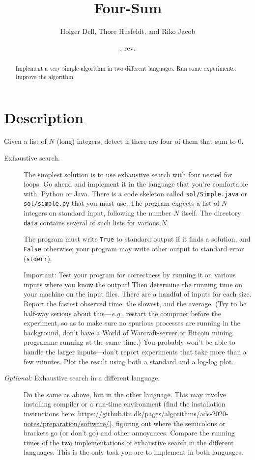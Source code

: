 \documentclass{tufte-handout}
\title{Four-Sum}
\author{Holger Dell, Thore Husfeldt, and Riko Jacob}
\date{\GITAuthorDate, rev. \GITAbrHash}
\begin{document}
\maketitle
\begin{abstract}
  Implement a very simple algorithm in two different languages. Run some experiments.
  Improve the algorithm.
\end{abstract}


 \section{Description}

 Given a list of $N$ (long) integers, detect if there are four of them that sum to $0$.

\begin{description}
  \item[Exhaustive search.]
The simplest solution is to use exhaustive search with four nested for loops.
Go ahead and implement it in the language that you're comfortable with, Python or Java.
There is a code skeleton called \texttt{sol/Simple.java} or \texttt{sol/simple.py} that you must use.
The program expects a list of $N$ integers on standard input, following the number $N$ itself.
The directory \texttt{data} contains several of such lists for various $N$.

The program must write \texttt{True} to standard output if it finds a solution, and \texttt{False} otherwise;
your program may write other output to standard error (\texttt{stderr}).

Important: Test your program for correctness by running it on various inputs where you know the output!
Then determine the running time on your machine on the input files.
There are a handful of inputs for each size.
Report the fastest observed time, the slowest, and the average.
(Try to be half-way serious about this---\emph{e.g.}, restart the computer before the experiment, so as to make sure no spurious processes are running in the background, don't have a World of Warcraft-server or Bitcoin mining programme running at the same time.)
You probably won't be able to handle the larger inputs---don't report experiments that take more than a few minutes.
Plot the result using both a standard and a log-log plot.

\item[\emph{Optional:} Exhaustive search in a different language.]
  Do the same as above, but in the other language.
  This may involve installing compiler or a run-time environment (find the installation instructions here: \url{https://github.itu.dk/pages/algorithms/ads-2020-notes/preparation/software/}), figuring out where the semicolons or brackets go (or don't go) and other annoyances.
  Compare the running times of the two implementations of exhaustive search in the different languages.
  This is the only task you are to implement in both languages.


\end{description}
\end{document}
